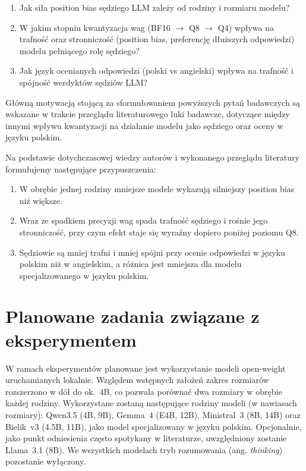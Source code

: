 \documentclass[11pt,a4paper]{article}
\begin{document}
\begin{enumerate}[label=\textbf{P\arabic*.}, leftmargin=2.5em]
  \item Jak siła position bias sędziego LLM zależy od rodziny i rozmiaru modelu?
  \item W jakim stopniu kwantyzacja wag (BF16 $\rightarrow$ Q8 $\rightarrow$ Q4) wpływa na trafność oraz stronniczość (position bias, preferencję dłuższych odpowiedzi) modelu pełniącego rolę sędziego?
  \item Jak język ocenianych odpowiedzi (polski vs angielski) wpływa na trafność i spójność werdyktów sędziów LLM?
\end{enumerate}

Główną motywacją stojącą za sformułowaniem powyższych pytań badawczych są wskazane w trakcie przeglądu literaturowego luki badawcze, dotyczące między innymi wpływu kwantyzacji na działanie modelu jako sędziego oraz oceny w języku polskim.

Na podstawie dotychczasowej wiedzy autorów i wykonanego przeglądu literatury formułujemy następujące przypuszczenia:
\begin{enumerate}[label=\textbf{H\arabic*.}, leftmargin=2.5em]
  \item W obrębie jednej rodziny mniejsze modele wykazują silniejszy position bias niż większe.
  \item Wraz ze spadkiem precyzji wag spada trafność sędziego i rośnie jego stronniczość, przy czym efekt staje się wyraźny dopiero poniżej poziomu Q8.
  \item Sędziowie są mniej trafni i mniej spójni przy ocenie odpowiedzi w języku polskim niż w angielskim, a różnica jest mniejsza dla modelu specjalizowanego w języku polskim.
\end{enumerate}

\section*{Planowane zadania związane z eksperymentem}
W ramach eksperymentów planowane jest wykorzystanie modeli open-weight uruchamianych lokalnie. Względem wstępnych założeń zakres rozmiarów rozszerzono w dół do ok.~4B, co pozwala porównać dwa rozmiary w obrębie każdej rodziny. Wykorzystane zostaną następujące rodziny modeli (w nawiasach rozmiary): Qwen3.5 (4B, 9B), Gemma~4 (E4B, 12B), Ministral~3 (8B, 14B) oraz Bielik~v3 (4.5B, 11B), jako model specjalizowany w języku polskim. Opcjonalnie, jako punkt odniesienia często spotykany w literaturze, uwzględniony zostanie Llama~3.1 (8B). We wszystkich modelach tryb rozumowania (ang. \emph{thinking}) pozostanie wyłączony.
\end{document}
